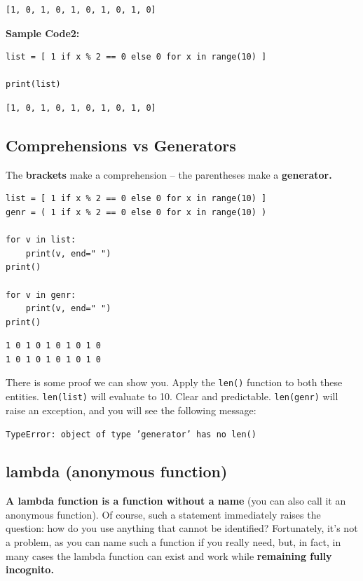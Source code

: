 \documentclass[11pt]{article}
\begin{document}
\begin{verbatim}
[1, 0, 1, 0, 1, 0, 1, 0, 1, 0]
\end{verbatim}

\vspace{10 mm}

\textbf{Sample Code2:}
\begin{verbatim}
list = [ 1 if x % 2 == 0 else 0 for x in range(10) ]

print(list)
\end{verbatim}

\begin{verbatim}
[1, 0, 1, 0, 1, 0, 1, 0, 1, 0]
\end{verbatim}

\newpage

\subsection{Comprehensions vs Generators}
\label{sec:org75f99df}
The \textbf{brackets} make a comprehension – the parentheses make a \textbf{generator.}

\begin{verbatim}
list = [ 1 if x % 2 == 0 else 0 for x in range(10) ]
genr = ( 1 if x % 2 == 0 else 0 for x in range(10) )

for v in list:
	print(v, end=" ")
print()

for v in genr:
	print(v, end=" ")
print()
\end{verbatim}

\begin{verbatim}
1 0 1 0 1 0 1 0 1 0 
1 0 1 0 1 0 1 0 1 0 
\end{verbatim}

There is some proof we can show you. Apply the \texttt{len()} function to both
these entities. \texttt{len(list)} will evaluate to 10. Clear and predictable.
\texttt{len(genr)} will raise an exception, and you will see the following
message:

\texttt{TypeError: object of type 'generator' has no len()}

\subsection{lambda (anonymous function)}
\label{sec:orgc3ef1f0}
\textbf{A lambda function is a function without a name} (you can also call it
an anonymous function). Of course, such a statement immediately raises
the question: how do you use anything that cannot be identified?
Fortunately, it’s not a problem, as you can name such a function if
you really need, but, in fact, in many cases the lambda function can
exist and work while \textbf{remaining fully incognito.}
\end{document}
